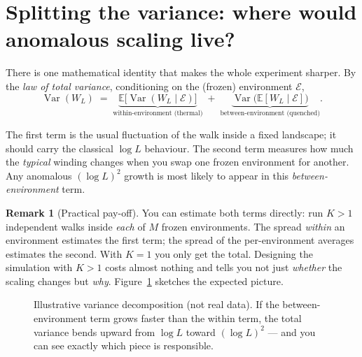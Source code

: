 \documentclass[11pt]{article}
\theoremstyle{definition}
\newtheorem{remark}{Remark}[section]
\theoremstyle{plain}
\newcommand{\E}{\mathbb{E}}
\newcommand{\Var}{\operatorname{Var}}
\newcommand{\Wind}{W_{L}}
\begin{document}
\section{Splitting the variance: where would anomalous scaling live?}

There is one mathematical identity that makes the whole experiment sharper. By
the \emph{law of total variance}, conditioning on the (frozen) environment
$\mathcal{E}$,
\[
   \Var(\Wind)
   \;=\;
   \underbrace{\E\!\big[\Var(\Wind\mid\mathcal{E})\big]}_{\text{within-environment (thermal)}}
   \;+\;
   \underbrace{\Var\!\big(\E[\Wind\mid\mathcal{E}]\big)}_{\text{between-environment (quenched)}} .
\]

The first term is the usual fluctuation of the walk inside a fixed landscape;
it should carry the classical $\log L$ behaviour. The second term measures how
much the \emph{typical} winding changes when you swap one frozen environment for
another. Any anomalous $(\log L)^2$ growth is most likely to appear in this
\emph{between-environment} term.

\begin{remark}[Practical pay-off]
You can estimate both terms directly: run $K>1$ independent walks inside
\emph{each} of $M$ frozen environments. The spread \emph{within} an environment
estimates the first term; the spread of the per-environment averages estimates
the second. With $K=1$ you only get the total. Designing the simulation with
$K>1$ costs almost nothing and tells you not just \emph{whether} the scaling
changes but \emph{why}. Figure~\ref{fig:decomp} sketches the expected picture.
\end{remark}

\begin{figure}[h]
\centering
{}
\caption{Illustrative variance decomposition (not real data). If the
between-environment term grows faster than the within term, the total variance
bends upward from $\log L$ toward $(\log L)^2$ --- and you can see exactly which
piece is responsible.}
\label{fig:decomp}
\end{figure}
\end{document}
